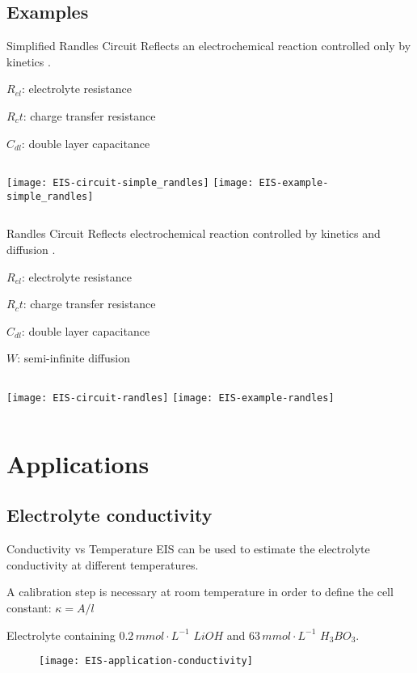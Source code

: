 \documentclass[10pt,compress,handout]{beamer}
\begin{document}
    \subsection{Examples}
    \begin{frame}{Simplified Randles Circuit}
        Reflects an electrochemical reaction controlled only by kinetics \citep{lazanas2023}.

        $R_{el}$: electrolyte resistance

        $R_ct$: charge transfer resistance

        $C_{dl}$: double layer capacitance

        \begin{columns}
                \texttt{[image: EIS-circuit-simple\_randles]}
                \texttt{[image: EIS-example-simple\_randles]}
        \end{columns}
    \end{frame}

    \begin{frame}{Randles Circuit}
        Reflects electrochemical reaction controlled by kinetics and diffusion \citep{lazanas2023}.

        $R_{el}$: electrolyte resistance

        $R_ct$: charge transfer resistance

        $C_{dl}$: double layer capacitance

        $W$: semi-infinite diffusion
        \begin{columns}
                \texttt{[image: EIS-circuit-randles]}
                \texttt{[image: EIS-example-randles]}
        \end{columns}
        
    \end{frame}

\section{Applications}
    \subsection{Electrolyte conductivity}
    \begin{frame}{Conductivity vs Temperature}
        EIS can be used to estimate the electrolyte conductivity at different temperatures.

        A calibration step is necessary at room temperature in order 
        to define the cell constant: $\kappa = A/l$

        Electrolyte containing $0.2 \,mmol \cdot L^{-1}$ $LiOH$ and $63 \, mmol \cdot L^{-1}$ $H_3BO_3$.
        \begin{figure}
            \centering
            \texttt{[image: EIS-application-conductivity]}
        \end{figure}
    \end{frame}
\end{document}

